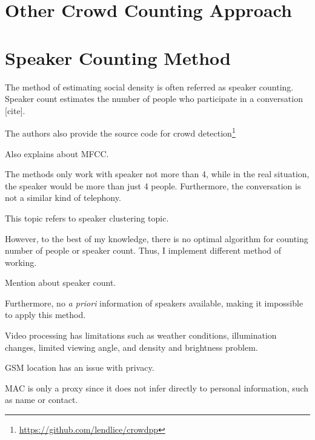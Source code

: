 
\section{Other Crowd Counting Approach} %
\label{sec:other_crowd_counting_approach}


\section{Speaker Counting Method} %
\label{sec:speaker_counting_method}
The method of estimating social density is often referred as speaker counting. Speaker count estimates the number of people who participate in a conversation [cite].

The authors also provide the source code for crowd detection\footnote{\url{https://github.com/lendlice/crowdpp}}

Also explains about MFCC.

The methods only work with speaker not more than 4, while in the real situation, the speaker would be more than just 4 people. Furthermore, the conversation is not a similar kind of telephony.

This topic refers to speaker clustering topic.

However, to the best of my knowledge, there is no optimal algorithm for counting number of people or speaker count. Thus, I implement different method of working.

Mention about speaker count.

Furthermore, no \textit{a priori} information of speakers available, making it impossible to apply this method.

Video processing has limitations such as weather conditions, illumination changes, limited viewing angle, and density and brightness problem. 

GSM location has an issue with privacy\cite{thesis017}.

MAC is only a proxy since it does not infer directly to personal information, such as name or contact.


